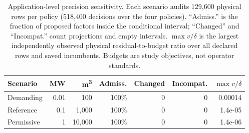 \begin{table}[tb]
\centering\small\setlength{\tabcolsep}{4pt}
\caption{Application-level precision sensitivity. Each scenario audits 129,600
physical rows per policy (518,400 decisions over the four policies).
``Admiss.'' is the fraction of proposed factors inside the conditional interval;
``Changed'' and ``Incompat.'' count projections and empty intervals.
$\max v/\delta$ is the largest independently observed physical residual-to-budget
ratio over all declared rows and saved incumbents. Budgets are study objectives,
not operator standards.}\label{tab:application-budget}
\begin{tabular}{lrrrrrr}\toprule
Scenario & MW & m\textsuperscript{3} & Admiss. & Changed & Incompat. & $\max v/\delta$\\\midrule
Demanding & 0.01 & 100 & 100\% & 0 & 0 & 0.00014 \\
Reference & 0.1 & 1,000 & 100\% & 0 & 0 & 1.4e-05 \\
Permissive & 1 & 10,000 & 100\% & 0 & 0 & 1.4e-06 \\
\bottomrule\end{tabular}\end{table}
